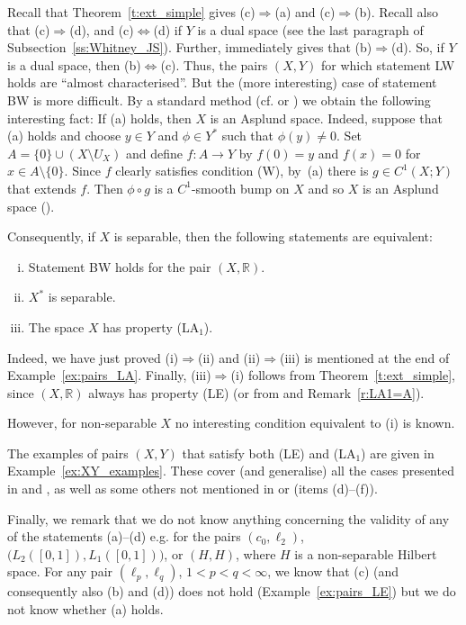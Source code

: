 \documentclass[a4paper,twoside,10pt,reqno,draft]{amsart}
\let\comp=\circ
\theoremstyle{definition}
\theoremstyle{remark}
\newcommand\R{{\mathbb R}}
\newcommand\pLA[1]{(LA$_#1$)}
\newcommand\pLE{(LE)}
\newcommand\cW{(W)}
\begin{document}
Recall that Theorem~\ref{t:ext_simple} gives (c)$\Rightarrow$(a) and (c)$\Rightarrow$(b).
Recall also that (c)$\Rightarrow$(d), and (c)$\Leftrightarrow$(d) if $Y$ is a dual space (see the last paragraph of Subsection~\ref{ss:Whitney_JS}).
Further, \cite[Proposition~2.8]{JS2} immediately gives that (b)$\Rightarrow$(d).
So, if $Y$ is a dual space, then (b)$\Leftrightarrow$(c).
Thus, the pairs $(X,Y)$ for which statement LW holds are ``almost characterised''.
But the (more interesting) case of statement BW is more difficult.
By a standard method (cf. \cite[Corollary~A.4 and the note after it]{JS1} or \cite[Proposition~4.3.10]{SPhD}) we obtain the following interesting fact:
If (a) holds, then $X$ is an Asplund space.
Indeed, suppose that (a) holds and choose $y\in Y$ and $\phi\in Y^*$ such that $\phi(y)\neq0$.
Set $A=\{0\}\cup(X\setminus U_X)$ and define $f\colon A\to Y$ by $f(0)=y$ and $f(x)=0$ for $x\in A\setminus\{0\}$.
Since $f$ clearly satisfies condition {\cW}, by~(a) there is $g\in C^1(X;Y)$ that extends $f$.
Then $\phi\comp g$ is a $C^1$-smooth bump on $X$ and so $X$ is an Asplund space (\cite[Theorem~II.5.3]{DGZ}).

Consequently, if $X$ is separable, then the following statements are equivalent:
\begin{enumerate}[(i)]
\item Statement BW holds for the pair $(X,\R)$.
\item $X^*$ is separable.
\item The space $X$ has property \pLA1.
\end{enumerate}
Indeed, we have just proved (i)$\Rightarrow$(ii) and (ii)$\Rightarrow$(iii) is mentioned at the end of Example~\ref{ex:pairs_LA}.
Finally, (iii)$\Rightarrow$(i) follows from Theorem~\ref{t:ext_simple}, since $(X,\R)$ always has property {\pLE} (or from \cite[Theorem A.2]{JS1} and Remark~\ref{r:LA1=A}).

However, for non-separable $X$ no interesting condition equivalent to (i) is known.

The examples of pairs $(X,Y)$ that satisfy both {\pLE} and \pLA1 are given in Example~\ref{ex:XY_examples}.
These cover (and generalise) all the cases presented in \cite[Corollary~3.4]{JS2} and \cite[p.~174]{JS1}, as well as some others not mentioned in \cite{JS2} or \cite{JS1} (items (d)--(f)).

Finally, we remark that we do not know anything concerning the validity of any of the statements (a)--(d) e.g. for the pairs $(c_0,\ell_2)$, $\bigl(L_2([0,1]),L_1([0,1])\bigr)$, or $(H,H)$, where $H$ is a non-separable Hilbert space.
For any pair $(\ell_p,\ell_q)$, $1<p<q<\infty$, we know that (c) (and consequently also (b) and (d)) does not hold (Example~\ref{ex:pairs_LE}) but we do not know whether (a) holds.
\end{document}
